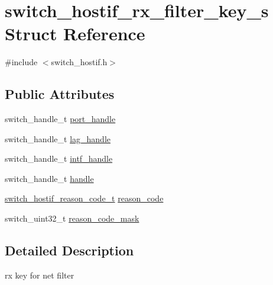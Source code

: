 \hypertarget{structswitch__hostif__rx__filter__key__s}{\section{switch\+\_\+hostif\+\_\+rx\+\_\+filter\+\_\+key\+\_\+s Struct Reference}
\label{structswitch__hostif__rx__filter__key__s}
}


{\ttfamily \#include $<$switch\+\_\+hostif.\+h$>$}

\subsection*{Public Attributes}
\begin{DoxyCompactItemize}
\item 
switch\+\_\+handle\+\_\+t \hyperlink{structswitch__hostif__rx__filter__key__s_a301a6fff09f069ff906bf2da948040b0}{port\+\_\+handle}
\item 
switch\+\_\+handle\+\_\+t \hyperlink{structswitch__hostif__rx__filter__key__s_acfcc73b37c5db1ac4c9b3479692b0122}{lag\+\_\+handle}
\item 
switch\+\_\+handle\+\_\+t \hyperlink{structswitch__hostif__rx__filter__key__s_a40785f4d573665a2ad367fadc194cb6a}{intf\+\_\+handle}
\item 
switch\+\_\+handle\+\_\+t \hyperlink{structswitch__hostif__rx__filter__key__s_ac05d23838debbee2a660a3a0058211fb}{handle}
\item 
\hyperlink{group__HostInterface_gab8b13524888d4f506357fae04c44babc}{switch\+\_\+hostif\+\_\+reason\+\_\+code\+\_\+t} \hyperlink{structswitch__hostif__rx__filter__key__s_a578ad7922c6456e96f71562a1fd2de61}{reason\+\_\+code}
\item 
switch\+\_\+uint32\+\_\+t \hyperlink{structswitch__hostif__rx__filter__key__s_a83a561e325a90201eaa5b6454884fa2b}{reason\+\_\+code\+\_\+mask}
\end{DoxyCompactItemize}


\subsection{Detailed Description}
rx key for net filter 

